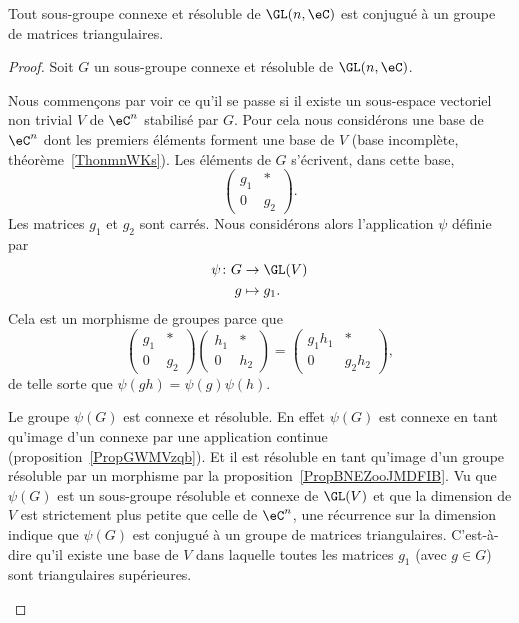 \begin{theorem}  \label{ThoUWQBooCvutTO}
	Tout sous-groupe connexe et résoluble de \( \GL(n,\eC)\) est conjugué à un groupe de matrices triangulaires.
\end{theorem}

\begin{proof}
	Soit \( G\) un sous-groupe connexe et résoluble de \( \GL(n,\eC)\).

	\begin{subproof}
		Nous commençons par voir ce qu'il se passe si il existe un sous-espace vectoriel non trivial \( V\) de \( \eC^n\) stabilisé par \( G\). Pour cela nous considérons une base de \( \eC^n\) dont les premiers éléments forment une base de \( V\) (base incomplète, théorème~\ref{ThonmnWKs}). Les éléments de \( G\) s'écrivent, dans cette base,
		\begin{equation}    \label{EqGOKTooEaGACG}
			\begin{pmatrix}
				g_1 & *   \\
				0   & g_2
			\end{pmatrix}.
		\end{equation}
		Les matrices \( g_1\) et \( g_2\) sont carrés. Nous considérons alors l'application \( \psi\) définie par
		\begin{equation}
			\begin{aligned}
				\psi\colon G & \to \GL(V)   \\
				g            & \mapsto g_1.
			\end{aligned}
		\end{equation}
		Cela est un morphisme de groupes parce que
		\begin{equation}
			\begin{pmatrix}
				g_1 & *   \\
				0   & g_2
			\end{pmatrix}\begin{pmatrix}
				h_1 & *   \\
				0   & h_2
			\end{pmatrix}=
			\begin{pmatrix}
				g_1h_1 & *      \\
				0      & g_2h_2
			\end{pmatrix},
		\end{equation}
		de telle sorte que \( \psi(gh)=\psi(g)\psi(h)\).

		Le groupe \( \psi(G)\) est connexe et résoluble. En effet \( \psi(G)\) est connexe en tant qu'image d'un connexe par une application continue (proposition~\ref{PropGWMVzqb}). Et il est résoluble en tant qu'image d'un groupe résoluble par un morphisme par la proposition~\ref{PropBNEZooJMDFIB}. Vu que \( \psi(G)\) est un sous-groupe résoluble et connexe de \( \GL(V)\) et que la dimension de \( V\) est strictement plus petite que celle de \( \eC^n\), une récurrence sur la dimension indique que \( \psi(G)\) est conjugué à un groupe de matrices triangulaires. C'est-à-dire qu'il existe une base de \( V\) dans laquelle toutes les matrices \( g_1\) (avec \( g\in G\)) sont triangulaires supérieures.


\end{subproof}
\end{proof}
